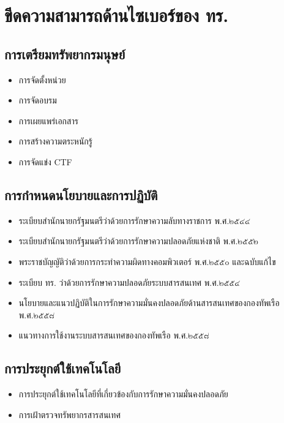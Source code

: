 \documentclass[../th_cyber_warfare_distilled.tex]{subfiles}
\begin{document}
\chapter{ขีดความสามารถด้านไซเบอร์ของ ทร.}
\section{การเตรียมทรัพยากรมนุษย์}
\begin{itemize}
	\item การจัดตั้งหน่วย
	\item การจัดอบรม 
	\item การเผยแพร่เอกสาร 
	\item การสร้างความตระหนักรู้
	\item การจัดแข่ง CTF
\end{itemize}
\section{การกำหนดนโยบายและการปฏิบัติ}
\begin{itemize}
	\item ระเบียบสำนักนายกรัฐมนตรีว่าด้วยการรักษาความลับทางราชการ พ.ศ.๒๕๔๔
	\item ระเบียบสำนักนายกรัฐมนตรีว่าด้วยการรักษาความปลอดภัยแห่งชาติ พ.ศ.๒๕๕๒
	\item พระราชบัญญัติว่าด้วยการกระทำความผิดทางคอมพิวเตอร์ พ.ศ.๒๕๕๐ และฉบับแก้ไข
	\item ระเบียบ ทร. ว่าด้วยการรักษาความปลอดภัยระบบสารสนเทศ พ.ศ.๒๕๕๔
	\item นโยบายและแนวปฏิบัติในการรักษาความมั่นคงปลอดภัยด้านสารสนเทศของกองทัพเรือ พ.ศ.๒๕๕๘
	\item แนวทางการใช้งานระบบสารสนเทศของกองทัพเรือ พ.ศ.๒๕๕๘
\end{itemize}
\section{การประยุกต์ใช้เทคโนโลยี}
\begin{itemize}
	\item การประยุกต์ใช้เทคโนโลยีที่เกี่ยวข้องกับการรักษาความมั่นคงปลอดภัย
	\item การเฝ้าตรวจทรัพยากรสารสนเทศ
\end{itemize}
\end{document}
